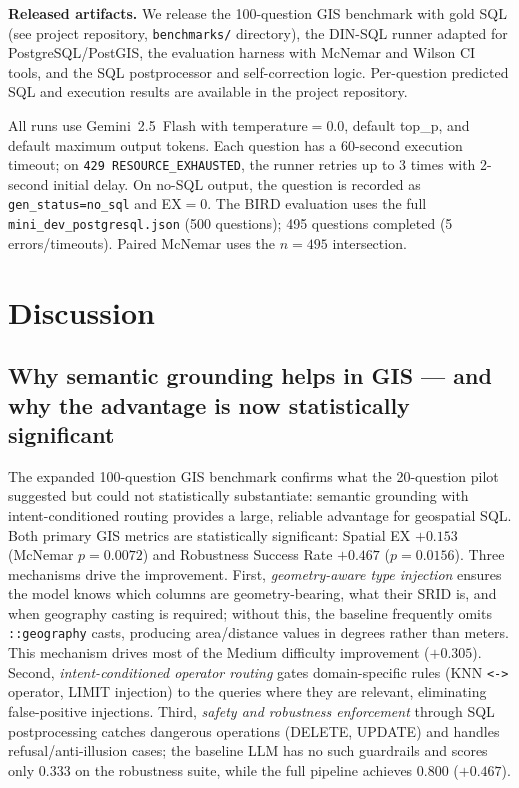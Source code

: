 \documentclass[11pt]{article}
\begin{document}
\noindent\textbf{Released artifacts.} We release the 100-question GIS benchmark with gold SQL (see project repository, \texttt{benchmarks/} directory), the DIN-SQL runner adapted for PostgreSQL/PostGIS, the evaluation harness with McNemar and Wilson CI tools, and the SQL postprocessor and self-correction logic. Per-question predicted SQL and execution results are available in the project repository.

\noindent All runs use Gemini~2.5~Flash with temperature$=0.0$, default top\_p, and default maximum output tokens. Each question has a 60-second execution timeout; on \texttt{429 RESOURCE\_EXHAUSTED}, the runner retries up to 3 times with 2-second initial delay. On no-SQL output, the question is recorded as \texttt{gen\_status=no\_sql} and EX$=0$. The BIRD evaluation uses the full \texttt{mini\_dev\_postgresql.json} (500 questions); 495 questions completed (5 errors/timeouts). Paired McNemar uses the $n=495$ intersection.

\section{Discussion}
\label{sec:discussion}

\subsection{Why semantic grounding helps in GIS --- and why the advantage is now statistically significant}

The expanded 100-question GIS benchmark confirms what the 20-question pilot suggested but could not statistically substantiate: semantic grounding with intent-conditioned routing provides a large, reliable advantage for geospatial SQL. Both primary GIS metrics are statistically significant: Spatial EX $+0.153$ (McNemar $p=0.0072$) and Robustness Success Rate $+0.467$ ($p=0.0156$). Three mechanisms drive the improvement. First, \emph{geometry-aware type injection} ensures the model knows which columns are geometry-bearing, what their SRID is, and when geography casting is required; without this, the baseline frequently omits \texttt{::geography} casts, producing area/distance values in degrees rather than meters. This mechanism drives most of the Medium difficulty improvement ($+0.305$). Second, \emph{intent-conditioned operator routing} gates domain-specific rules (KNN \texttt{<-}\texttt{>} operator, LIMIT injection) to the queries where they are relevant, eliminating false-positive injections. Third, \emph{safety and robustness enforcement} through SQL postprocessing catches dangerous operations (DELETE, UPDATE) and handles refusal/anti-illusion cases; the baseline LLM has no such guardrails and scores only $0.333$ on the robustness suite, while the full pipeline achieves $0.800$ ($+0.467$).
\end{document}
